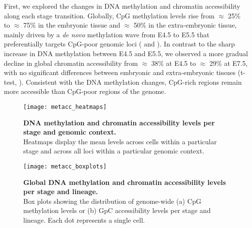 First, we explored the changes in DNA methylation and chromatin accessibility along each stage transition. Globally, CpG methylation levels rise from $\approx$ 25\% to $\approx$ 75\% in the embryonic tissue and $\approx$ 50\% in the extra-embryonic tissue, mainly driven by a \textit{de novo} methylation wave from E4.5 to E5.5 that preferentially targets CpG-poor genomic loci \cite{Auclair2014,Zhang2017} ( and ). In contrast to the sharp increase in DNA methylation between E4.5 and E5.5, we observed a more gradual decline in global chromatin accessibility from $\approx$ 38\% at E4.5 to $\approx$ 29\% at E7.5, with no significant differences between embryonic and extra-embryonic tissues (t-test, ). Consistent with the DNA methylation changes, CpG-rich regions remain more accessible than CpG-poor regions of the genome.

\begin{figure}[H]
	\centering
	\texttt{[image: metacc\_heatmaps]}
	\caption[]{\textbf{DNA methylation and chromatin accessibility levels per stage and genomic context.}\\
	Heatmaps display the mean levels across cells within a particular stage and across all loci within a particular genomic context.
	}
	\label{fig:metacc_heatmaps}
\end{figure}

\begin{figure}[H]
	\centering
	\texttt{[image: metacc\_boxplots]}
	\caption[]{
	\textbf{Global DNA methylation and chromatin accessibility levels per stage and lineage.} \\
	Box plots showing the distribution of genome-wide (a) CpG methylation levels or (b) GpC accessibility levels per stage and lineage. Each dot represents a single cell.
	}
	\label{fig:metacc_boxplots}
\end{figure}

